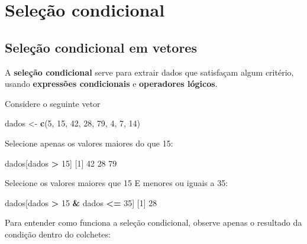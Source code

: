 \documentclass[10pt,a4paper]{book}
\newenvironment{Shaded}{\begin{snugshade}}{\end{snugshade}}
\newcommand{\KeywordTok}[1]{\textcolor[rgb]{0.13,0.29,0.53}{\textbf{#1}}}
\newcommand{\DecValTok}[1]{\textcolor[rgb]{0.00,0.00,0.81}{#1}}
\newcommand{\StringTok}[1]{\textcolor[rgb]{0.31,0.60,0.02}{#1}}
\newcommand{\OperatorTok}[1]{\textcolor[rgb]{0.81,0.36,0.00}{\textbf{#1}}}
\newcommand{\NormalTok}[1]{#1}
\begin{document}
\section{Seleção condicional}\label{selecao-condicional}

\subsection{Seleção condicional em
vetores}\label{selecao-condicional-em-vetores}

A \textbf{seleção condicional} serve para extrair dados que satisfaçam
algum critério, usando \textbf{expressões condicionais} e
\textbf{operadores lógicos}.

Considere o seguinte vetor

\begin{Shaded}
\begin{Highlighting}[]
\NormalTok{dados <-}\StringTok{ }\KeywordTok{c}\NormalTok{(}\DecValTok{5}\NormalTok{, }\DecValTok{15}\NormalTok{, }\DecValTok{42}\NormalTok{, }\DecValTok{28}\NormalTok{, }\DecValTok{79}\NormalTok{, }\DecValTok{4}\NormalTok{, }\DecValTok{7}\NormalTok{, }\DecValTok{14}\NormalTok{)}
\end{Highlighting}
\end{Shaded}

Selecione apenas os valores maiores do que 15:

\begin{Shaded}
\begin{Highlighting}[]
\NormalTok{dados[dados }\OperatorTok{>}\StringTok{ }\DecValTok{15}\NormalTok{]}
\NormalTok{[}\DecValTok{1}\NormalTok{] }\DecValTok{42} \DecValTok{28} \DecValTok{79}
\end{Highlighting}
\end{Shaded}

Selecione os valores maiores que 15 E menores ou iguais a 35:

\begin{Shaded}
\begin{Highlighting}[]
\NormalTok{dados[dados }\OperatorTok{>}\StringTok{ }\DecValTok{15} \OperatorTok{&}\StringTok{ }\NormalTok{dados }\OperatorTok{<=}\StringTok{ }\DecValTok{35}\NormalTok{]}
\NormalTok{[}\DecValTok{1}\NormalTok{] }\DecValTok{28}
\end{Highlighting}
\end{Shaded}

Para entender como funciona a seleção condicional, observe apenas o
resultado da condição dentro do colchetes:
\end{document}
